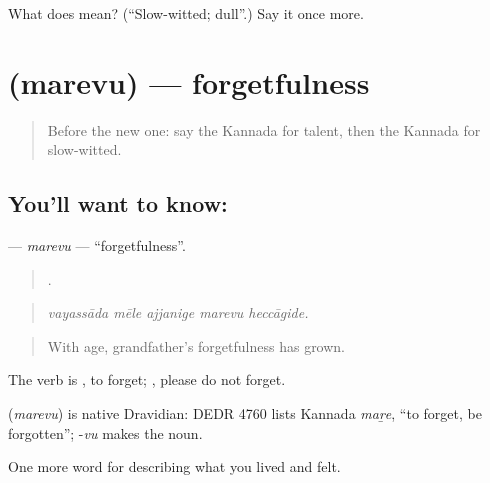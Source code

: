 \begin{tcolorbox}[breakable,colback=teal!4,colframe=teal!35!black,title={Before you move on}]
What does  mean? (\textquotedblleft{}Slow-witted; dull\textquotedblright{}.) Say it once more.
\end{tcolorbox}
\section[\texorpdfstring{\kn{ಮರೆವು} (marevu)}{ಮರೆವು (marevu)}]{ (marevu) — forgetfulness}

\label{lesson:KA-C503-marevu}



\begin{quote}
Before the new one: say the Kannada for talent, then the Kannada for slow-witted.
\end{quote}

\subsection*{You'll want to know: }
\textbf{} — \emph{marevu} — \textquotedblleft{}forgetfulness\textquotedblright{}.

\begin{quote}
    .
\end{quote}

\begin{quote}
\emph{vayassāda mēle ajjanige marevu heccāgide.}
\end{quote}

\begin{quote}
With age, grandfather's forgetfulness has grown.
\end{quote}

The verb is , to forget; , please do not forget.

\begin{cousinweb}
\textbf{} (\emph{marevu}) is native Dravidian: DEDR 4760 lists Kannada \emph{maṟe}, \textquotedblleft{}to forget, be forgotten\textquotedblright{}; -\emph{vu} makes the noun.
\end{cousinweb}

\begin{grammarlens}[title={What you've built}]
One more word for describing what you lived and felt.
\end{grammarlens}

